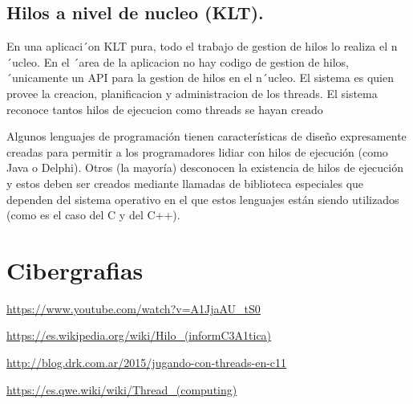\documentclass{article}
\begin{document}
\subsection{Hilos a nivel de nucleo (KLT).}
En una aplicaci´on KLT pura, todo el trabajo de gestion de
hilos lo realiza el n´ucleo. En el ´area de la aplicacion no
hay codigo de gestion de hilos, ´unicamente un API para la
gestion de hilos en el n´ucleo. El sistema es quien provee la
creacion, planificacion y administracion de los threads. El
sistema reconoce tantos hilos de ejecucion como threads se
hayan creado
\vspace{5mm}
\par 
Algunos lenguajes de programación tienen características de diseño expresamente creadas para permitir a los programadores lidiar con hilos de ejecución (como Java o Delphi). Otros (la mayoría) desconocen la existencia de hilos de ejecución y estos deben ser creados mediante llamadas de biblioteca especiales que dependen del sistema operativo en el que estos lenguajes están siendo utilizados (como es el caso del C y del C++).

\section{Cibergrafias}
\url{https://www.youtube.com/watch?v=A1JjaAU_tS0}
\par
\vspace{2mm}
\url{https://es.wikipedia.org/wiki/Hilo_(informC3A1tica)}
\par
\vspace{2mm}
\url{http://blog.drk.com.ar/2015/jugando-con-threads-en-c11}
\vspace{2mm}
\par
\url{https://es.qwe.wiki/wiki/Thread_(computing)}
\end{document}
